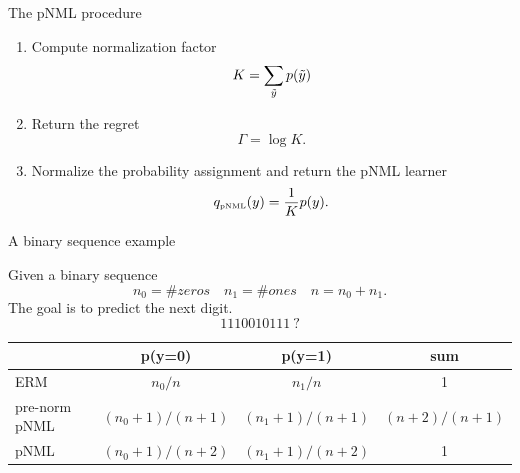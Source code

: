 \documentclass[aspectratio=169]{beamer}
\begin{document}
\begin{frame}{The pNML procedure}
\begin{enumerate}
\setlength\itemsep{2em}
\setcounter{enumi}{4}
\item Compute normalization factor
    \begin{equation*}
        K = \sum_{\Tilde{y}}p(\Tilde{y})
    \end{equation*}
\item Return the regret
\begin{equation*}
    \Gamma = \log K.  
\end{equation*}
\item Normalize the probability assignment and return the pNML learner
    \begin{equation*}
        q_{\mbox{\tiny{pNML}}}(y) = \frac{1}{K}p(y).
    \end{equation*}
\end{enumerate}
\end{frame}



\begin{frame}{A binary sequence example}
\centering
\begin{Example}
    Given a binary sequence  
    \begin{equation}
    n_0 = \#zeros \quad n_1 = \#ones \quad n = n_0 + n_1.
    \end{equation}
    The goal is to predict the next digit. \\
    \begin{equation*}
    1110010111 \ ?   
    \end{equation*}
    \pause
    \centering
    \begin{tabular}{l|c|c|c}
        & p(y=0)    & p(y=1) & sum    \\
        \hline
        ERM    &   $n_0/n$        &  $n_1/n$ & 1   \\
        \hline
        pre-norm pNML &   $(n_0+1)/(n+1)$        &  $(n_1+1)/(n+1)$ & $(n+2)/(n+1)$  \\
        \hline
        pNML &   $(n_0+1)/(n+2)$        &  $(n_1+1)/(n+2)$ & 1  \\
    \end{tabular}
\end{Example}
\end{frame}
\end{document}
